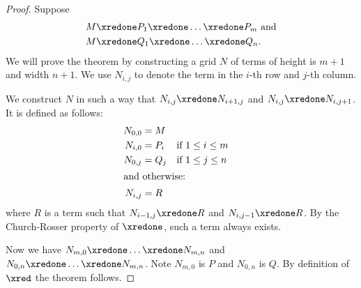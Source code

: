 \documentclass[../../../include/open-logic-section]{subfiles}
\begin{document}
\begin{proof}
  Suppose 
  \begin{align*}
    M & \xredone P_1 \xredone \dots \xredone P_m \text{ and}\\
    M & \xredone Q_1 \xredone \dots \xredone Q_n.
  \end{align*}
  We will prove the theorem by constructing a grid $N$ of terms of
  height is $m + 1$ and width $n + 1$. We use $N_{i,j}$ to denote the
  term in the $i$-th row and $j$-th column.
  
  We construct $N$ in such a way that $N_{i,j} \xredone N_{i+1,j}$ and
  $N_{i,j} \xredone N_{i,j+1}$. It is defined as follows:
  \begin{align*}
    N_{0,0} &= M \\
    N_{i,0} &= P_i && \text{if } 1 \le i \le m \\
    N_{0,j} &= Q_j && \text{if } 1 \le j \le n \\
  \intertext{and otherwise:}
    N_{i,j} &= R
  \end{align*}
  where $R$ is a term such that $N_{i-1,j} \xredone R$ and $N_{i,j-1}
  \xredone R$. By the Church-Rosser property of $\xredone$, such a
  term always exists.

  Now we have $N_{m,0} \xredone \dots \xredone N_{m,n}$ and $N_{0,n}
  \xredone \dots \xredone N_{m,n}$. Note $N_{m,0}$ is $P$ and $N_{0,n}$
  is $Q$. By definition of $\xred$ the theorem follows.
\end{proof}
\end{document}
